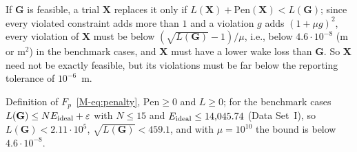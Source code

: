 \begin{lemS}
\label{lem:S-feas-improve}
If $\mathbf G$ is feasible, a trial $\mathbf X$ replaces it only if $L(\mathbf X)+\mathrm{Pen}(\mathbf X)<L(\mathbf G)$; since every violated constraint adds more than $1$ and a violation $g$ adds $(1+\mu g)^2$, every violation of $\mathbf X$ must be below $(\sqrt{L(\mathbf G)}-1)/\mu$, i.e., below $4.6\cdot10^{-8}$ (m or m$^2$) in the benchmark cases, and $\mathbf X$ must have a lower wake loss than $\mathbf G$. So $\mathbf X$ need not be exactly feasible, but its violations must be far below the reporting tolerance of $10^{-6}$~m.
\end{lemS}
\begin{thSproof}
Definition of $F_p$~\eqref{M-eq:penalty}, $\mathrm{Pen}\ge0$ and $L\ge0$; for the benchmark cases $L(\mathbf G)\le NE_{\rm ideal}+\varepsilon$ with $N\le15$ and $E_{\rm ideal}\le14{,}045.74$ (Data Set~I), so $L(\mathbf G)<2.11\cdot10^5$, $\sqrt{L(\mathbf G)}<459.1$, and with $\mu=10^{10}$ the bound is below $4.6\cdot10^{-8}$. %
\end{thSproof}

